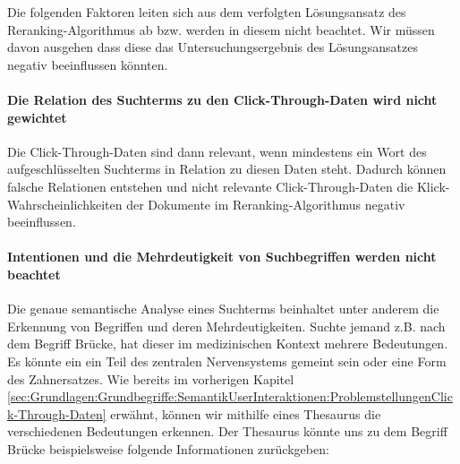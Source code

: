 Die folgenden Faktoren leiten sich aus dem verfolgten Lösungsansatz des Reranking-Algorithmus ab bzw. werden in diesem nicht beachtet. Wir müssen davon ausgehen dass diese das Untersuchungsergebnis des Lösungsansatzes negativ beeinflussen könnten.

\paragraph{Die Relation des Suchterms zu den Click-Through-Daten wird nicht gewichtet}
Die Click-Through-Daten sind dann relevant, wenn mindestens ein Wort des aufgeschlüsselten Suchterms in Relation zu diesen Daten steht. Dadurch können falsche Relationen entstehen und nicht relevante Click-Through-Daten die Klick-Wahrscheinlichkeiten der Dokumente im Reranking-Algorithmus negativ beeinflussen.

\paragraph{Intentionen und die Mehrdeutigkeit von Suchbegriffen werden nicht beachtet}
Die genaue semantische Analyse eines Suchterms beinhaltet unter anderem die Erkennung von Begriffen und deren Mehrdeutigkeiten. Suchte jemand z.B. nach dem Begriff \glqq Brücke\grqq{}, hat dieser im medizinischen Kontext mehrere Bedeutungen. Es könnte ein \glqq ein Teil des zentralen Nervensystems\grqq{} gemeint sein oder eine \glqq Form des Zahnersatzes\grqq{}. Wie bereits im vorherigen Kapitel \ref{sec:Grundlagen:Grundbegriffe:SemantikUserInteraktionen:ProblemstellungenClick-Through-Daten} erwähnt, können wir mithilfe eines Thesaurus die verschiedenen Bedeutungen erkennen. Der Thesaurus könnte uns zu dem Begriff \glqq Brücke\grqq{} beispielsweise folgende Informationen zurückgeben:

